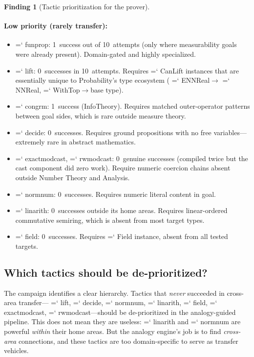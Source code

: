 \documentclass[11pt]{article}
\renewcommand{\texttt}[1]{%
  \begingroup\ttfamily\hyphenchar\font=`\-\relax
  \def\_{\textunderscore\discretionary{}{}{}}%
  #1\endgroup}
\theoremstyle{definition}
\newtheorem{finding}[theorem]{Finding}
\theoremstyle{remark}
\begin{document}
\begin{finding}[Tactic prioritization for the prover]
\paragraph{Low priority (rarely transfer):}
\begin{itemize}
\item \texttt{fun\_prop}: 1~success out of 10~attempts (only
  where measurability goals were already present).  Domain-gated
  and highly specialized.
\item \texttt{lift}: 0~successes in 10~attempts.  Requires
  \texttt{CanLift} instances that are essentially unique to
  Probability's type ecosystem (\texttt{ENNReal}$\to$\texttt{NNReal},
  \texttt{WithTop}$\to$base type).
\item \texttt{congrm}: 1~success (InfoTheory).  Requires matched
  outer-operator patterns between goal sides, which is rare outside
  measure theory.
\item \texttt{decide}: 0~successes.  Requires ground propositions
  with no free variables---extremely rare in abstract mathematics.
\item \texttt{exact\_mod\_cast}, \texttt{rw\_mod\_cast}: 0~genuine
  successes (compiled twice but the cast component did zero work).
  Require numeric coercion chains absent outside Number Theory and
  Analysis.
\item \texttt{norm\_num}: 0~successes.  Requires numeric literal
  content in goal.
\item \texttt{linarith}: 0~successes outside its home areas.
  Requires linear-ordered commutative semiring, which is absent
  from most target types.
\item \texttt{field}: 0~successes.  Requires \texttt{Field}
  instance, absent from all tested targets.
\end{itemize}
\end{finding}

\subsection{Which tactics should be de-prioritized?}

The campaign identifies a clear hierarchy.  Tactics that \emph{never}
succeeded in cross-area transfer---\texttt{lift}, \texttt{decide},
\texttt{norm\_num}, \texttt{linarith}, \texttt{field},
\texttt{exact\_mod\_cast}, \texttt{rw\_mod\_cast}---should be
de-prioritized in the analogy-guided pipeline.  This does not mean
they are useless: \texttt{linarith} and \texttt{norm\_num} are
powerful \emph{within} their home areas.  But the analogy engine's
job is to find \emph{cross-area} connections, and these tactics are
too domain-specific to serve as transfer vehicles.
\end{document}
